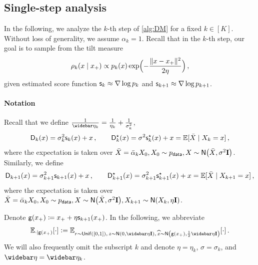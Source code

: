 





\subsection{Single-step analysis}

In the following, we analyze the $k$-th step of \cref{alg:DM} for a fixed $k\in[K]$. Without loss of generality, we assume $\alpha_k=1$.
Recall that in the $k$-th step, our goal is to sample from the tilt measure
\begin{align}\label{eq:def-nu-xz}
    \rho_k(x\mid x_+)\propto p_k(x) \exp\prn[\Big]{-\frac{\nrm{x-x_+}^2}{2\eta}}\,,
\end{align}
given estimated score function $\scf_k\approx \nabla \log p_k$ and $\scf_{k+1}\approx \nabla \log p_{k+1}$. 






\paragraph{Notation}
Recall that we define %
$\frac{1}{\etabar_k} = \frac{1}{\eta_k} +\frac{1}{\sigma_k^2}$, 
\begin{align*}
    \Dn_k(x)=\sigma_k^2 \scf_k(x)+x\,, \qquad
    \Ds_k(x)=\sigma^2 \scfs_k(x)+x=\En[\Xbar\mid X_k=x]\,,
\end{align*}
where the expectation is taken over $\Xbar=\alpbar_k X_0, X_0\sim \pdata, X\sim \normal{\Xbar,\sigma^2\Id}$.
Similarly, we define
\begin{align*}
    \Dn_{k+1}(x)=\sigma_{k+1}^2 \scf_{k+1}(x)+x\,, \qquad
    \Ds_{k+1}(x)=\sigma_{k+1}^2 \scfs_{k+1}(x)+x=\En[\Xbar\mid X_{k+1}=x]\,,
\end{align*}
where the expectation is taken over $\Xbar=\alpbar_k X_0, X_0\sim \pdata, X\sim \normal{\Xbar,\sigma^2\Id}, X_{k+1}\sim \normal{X_k,\eta\Id}$.

Denote $\gd(x_+)\deq x_++\eta\scf_{k+1}(x_+)$.
In the following, we abbreviate
\begin{align*}
    \Enxp[\cdot]\ldef \En_{\lr\sim \unif([0,1]),\,z\sim\Netabar,\, \xhat\sim \normal{\gd(x_+),\frac12\etabar\Id}}[\cdot]\,.
\end{align*}
We will also frequently omit the subscript $k$ and denote $\eta=\eta_k$, $\sigma=\sigma_k$, and $\etabar=\etabar_k$.

